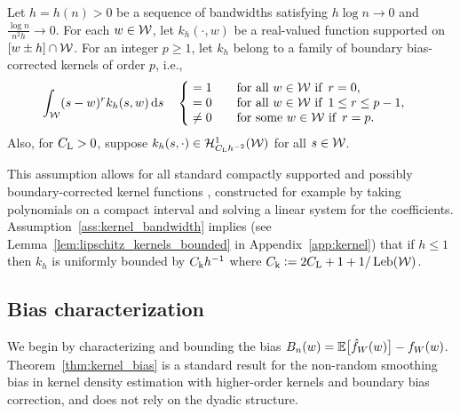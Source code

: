 \begin{assumption}\label{ass:kernel_bandwidth}%

  Let $h = h(n) > 0$ be a sequence of bandwidths satisfying $h \log n \to 0$
  and $\frac{\log n}{n^2h} \to 0$. For each $w \in \mathcal{W}$, let $k_h(\cdot, w)$ be
  a real-valued function supported on $[w \pm h] \cap \mathcal{W}$. For an integer
  $p \geq 1$, let $k_h$ belong to a family of boundary bias-corrected kernels
  of order $p$, i.e.,
  \begin{align*}
    \int_{\mathcal{W}}
    (s-w)^r k_h(s,w) \,\mathrm{d}s
    \quad
    \begin{cases}
      \begin{alignedat}{2}
        &= 1 &\qquad &\text{for all } w \in \mathcal{W} \text{ if }\, r = 0, \\
        &= 0 & &\text{for all } w \in \mathcal{W} \text{ if }\, 1 \leq r \leq p-1, \\
        &\neq 0 & &\text{for some } w \in \mathcal{W} \text{ if }\, r = p.
      \end{alignedat}
    \end{cases}
  \end{align*}
  Also, for $C_{\mathrm{L}} > 0$,
  suppose $k_h(s, \cdot) \in \mathcal{H}^1_{C_{\mathrm{L}} h^{-2}}(\mathcal{W})$
  for all $s \in \mathcal{W}$.
\end{assumption}

This assumption allows for all standard compactly supported and possibly
boundary-corrected kernel functions
\citep{wand1994kernel,simonoff1996smoothing}, constructed for example by taking
polynomials on a compact interval and solving a linear system for the
coefficients. Assumption~\ref{ass:kernel_bandwidth} implies
(see Lemma~\ref{lem:lipschitz_kernels_bounded} in Appendix~\ref{app:kernel})
that if $h \leq 1$ then $k_h$ is uniformly bounded by
$C_{\mathrm{k}} h^{-1}$ where $C_{\mathrm{k}} \vcentcolon = 2 C_{\mathrm{L}} + 1 + 1/\operatorname{Leb}(\mathcal{W})$.

\subsection{Bias characterization}
\label{sec:kernel_bias}

We begin by characterizing and bounding the bias
$B_n(w) = \mathbb{E} \big[ \hat f_W(w) \big] - f_W(w)$.
Theorem~\ref{thm:kernel_bias} is a standard result for the non-random smoothing
bias in kernel density estimation with higher-order kernels and boundary bias
correction, and does not rely on the dyadic structure.

